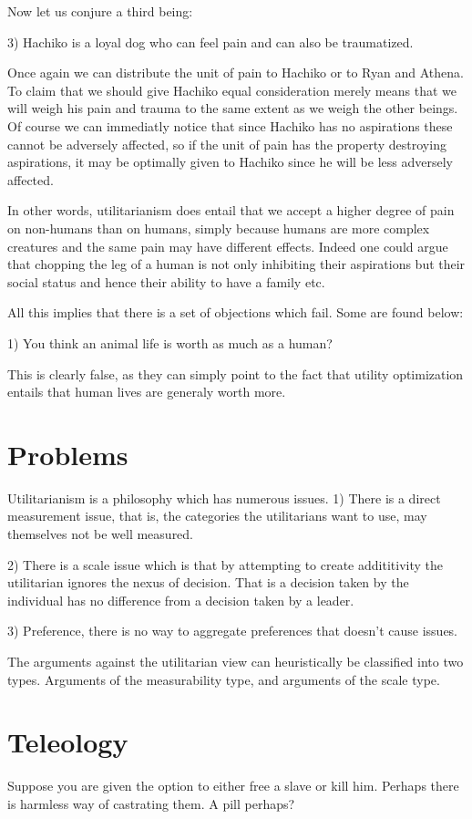 \documentclass[12pt]{report}
\numberwithin{equation}{section}
\begin{document}
Now let us conjure a third being: 

3) Hachiko is a loyal dog who can feel pain and can also be traumatized. 

Once again we can distribute the unit of pain to Hachiko or to Ryan and Athena. To claim that we should give Hachiko equal consideration merely means that we will weigh his pain and trauma to the same extent as we weigh the other beings. Of course we can immediatly notice that since Hachiko has no aspirations these cannot be adversely affected, so if the unit of pain has the property destroying aspirations, it may be optimally given to Hachiko since he will be less adversely affected. 

In other words, utilitarianism does entail that we accept a higher degree of pain on non-humans than on humans, simply because humans are more complex creatures and the same pain may have different effects. Indeed one could argue that chopping the leg of a human is not only inhibiting their aspirations but their social status and hence their ability to have a family etc. 

All this implies that there is a set of objections which fail. Some are found below:

1) You think an animal life is worth as much as a human? 

This is clearly false, as they can simply point to the fact that utility optimization entails that human lives are generaly worth more. 

\section{Problems}

Utilitarianism is a philosophy which has numerous issues. 
1) There is a direct measurement issue, that is, the categories the utilitarians want to use, may themselves not be well measured. 

2) There is a scale issue which is that by attempting to create addititivity the utilitarian ignores the nexus of decision. That is a decision taken by the individual has no difference from a decision taken by a leader. 

3) Preference, there is no way to aggregate preferences that doesn't cause issues. 

The arguments against the utilitarian view can heuristically be classified into two types. Arguments of the measurability type, and arguments of the scale type. 

\section{Teleology}
Suppose you are given the option to either free a slave or kill him. Perhaps there is harmless way of castrating them. A pill perhaps? 
\end{document}
